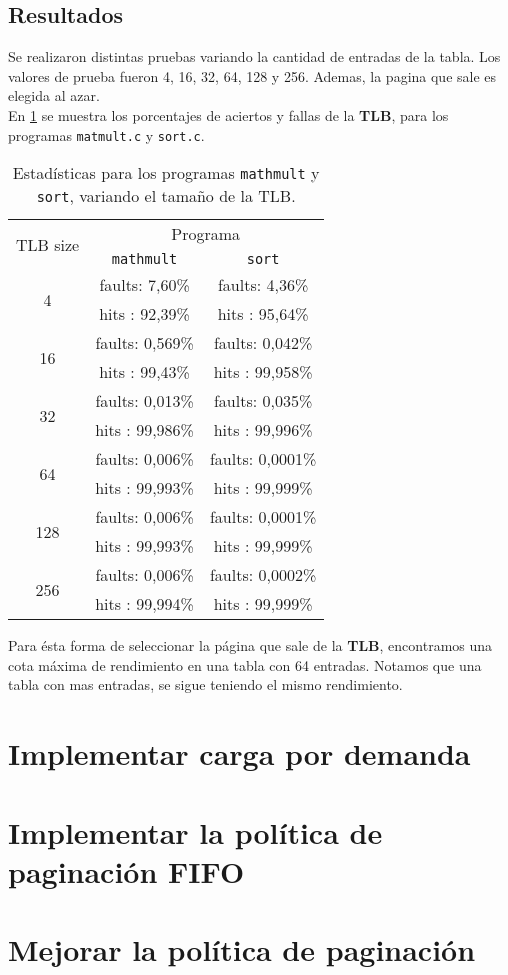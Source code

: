 \subsection*{Resultados}
Se realizaron distintas pruebas variando la cantidad de entradas de la tabla. Los valores de prueba fueron 4, 16, 32, 64, 128 y 256. Ademas, la pagina que sale es elegida al azar.\\
En \ref{tab:practica04:statics} se muestra los porcentajes de aciertos y fallas de la \textbf{TLB}, para los programas \texttt{matmult.c} y \texttt{sort.c}.\\ 
\begin{table}
	\center
	\begin{tabular}{|c|c|c|}
	    \hline
		\multirow{2}{*}{TLB size}   &    \multicolumn{2}{c|}{Programa}           \\
		\cline{2-3}
                                    &    \texttt{mathmult}    &    \texttt{sort} \\
		\hline
		\multirow{2}{*}{4}          &     faults:  7,60\%     &    faults:  4,36\% \\
		                            &     hits  : 92,39\%     &    hits  : 95,64\%    \\               
		\multirow{2}{*}{16}         &     faults:  0,569\%    &    faults:  0,042\%    \\
		                            &     hits  : 99,43\%     &    hits  : 99,958\%    \\             
		\multirow{2}{*}{32}         &     faults:  0,013\%    &    faults:  0,035\%    \\
		                            &     hits  : 99,986\%    &    hits  : 99,996\%    \\               
		\multirow{2}{*}{64}         &     faults:  0,006\%    &    faults:  0,0001\%    \\
		                            &     hits  : 99,993\%    &    hits  : 99,999\%    \\               
		\multirow{2}{*}{128}        &     faults:  0,006\%    &    faults:  0,0001\%    \\
		                            &     hits  : 99,993\%    &    hits  : 99,999\%    \\               
		\multirow{2}{*}{256}        &     faults:  0,006\%    &    faults:  0,0002\%    \\
		                            &     hits  : 99,994\%    &    hits  : 99,999\%    \\ \hline             
	\end{tabular}
    \caption{Estadísticas para los programas \texttt{mathmult} y \texttt{sort}, variando el tamaño de la TLB.}
	\label{tab:practica04:statics}
\end{table}
Para ésta forma de seleccionar la página  que sale de la \textbf{TLB}, encontramos una cota máxima de rendimiento en una tabla con 64 entradas. Notamos que una tabla con mas entradas, se sigue teniendo el mismo rendimiento.
\newpage
\section{Implementar carga por demanda}
\section{Implementar la política de paginación FIFO}
\section{Mejorar la política de paginación}